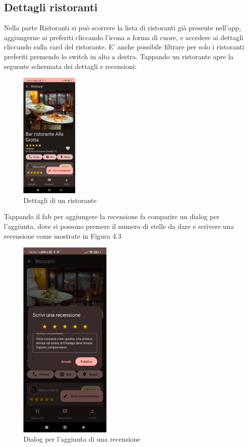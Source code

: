 \documentclass[12pt, a4paper]{report}
\begin{document}
	\subsection{Dettagli ristoranti}
	Nella parte Ristoranti si può scorrere la lista di ristoranti già presente nell'app, aggiungerne ai preferiti cliccando l'icona a forma di cuore, e accedere ai dettagli cliccando sulla card del ristorante. E' anche possibile filtrare per solo i ristoranti preferiti premendo lo switch in alto a destra.
	Tappando un ristorante apre la seguente schermata dei dettagli e recensioni:



	\begin{figure}[h]
		\centering
		\includegraphics[width=0.25\textwidth]{screenDetails.jpg} 
	  \caption{Dettagli di un ristorante}
		
	\end{figure}


	Tappando il fab per aggiungere la recensione fa comparire un dialog per l'aggiunta, dove si possono premere il numero di stelle da dare e scrivere una recensione come mostrate in Figura 4.3
	\pagebreak

	\begin{figure}[h]
		\centering
		\includegraphics[width=0.4\textwidth]{addReviewDialog.jpg} 
	  \caption{Dialog per l'aggiunta di una recensione}
		
	\end{figure}
	\newpage
\end{document}
